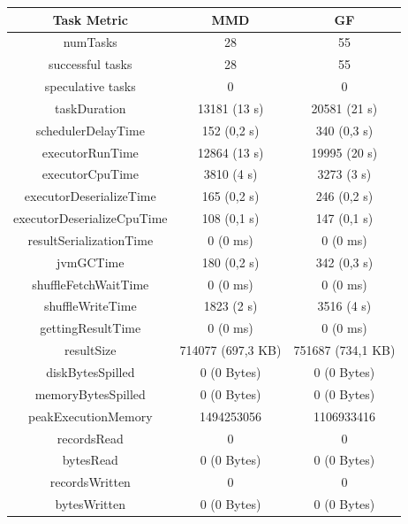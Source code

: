 \documentclass[a4paper,11pt, twoside]{article}
\begin{document}
            \begin{table}[h!]
                    \centering
            	\small
            	\begin{tabular}{ccc}
            		\toprule
            		  \textbf{Task Metric} & \textbf{MMD} & \textbf{GF} \\
            		\midrule
            		numTasks & 28 & 55 \\
                        successful tasks & 28 & 55 \\
                        speculative tasks & 0 & 0 \\
                        taskDuration & 13181 (13 s) & 20581 (21 s) \\
                        schedulerDelayTime & 152 (0,2 s) & 340 (0,3 s) \\
                        executorRunTime & 12864 (13 s) & 19995 (20 s) \\
                        executorCpuTime & 3810 (4 s) & 3273 (3 s) \\
                        executorDeserializeTime & 165 (0,2 s) & 246 (0,2 s) \\
                        executorDeserializeCpuTime & 108 (0,1 s) & 147 (0,1 s) \\
                        resultSerializationTime & 0 (0 ms) & 0 (0 ms) \\
                        jvmGCTime & 180 (0,2 s) & 342 (0,3 s) \\
                        shuffleFetchWaitTime & 0 (0 ms) & 0 (0 ms) \\
                        shuffleWriteTime & 1823 (2 s) & 3516 (4 s) \\
                        gettingResultTime & 0 (0 ms) & 0 (0 ms) \\
                        resultSize & 714077 (697,3 KB) & 751687 (734,1 KB) \\
                        diskBytesSpilled & 0 (0 Bytes) & 0 (0 Bytes) \\
                        memoryBytesSpilled & 0 (0 Bytes) & 0 (0 Bytes) \\
                        peakExecutionMemory & 1494253056 & 1106933416 \\
                        recordsRead & 0 & 0 \\
                        bytesRead & 0 (0 Bytes)  & 0 (0 Bytes) \\
                        recordsWritten & 0 & 0 \\
                        bytesWritten & 0 (0 Bytes) & 0 (0 Bytes) \\

\end{tabular}
\end{table}
\end{document}
